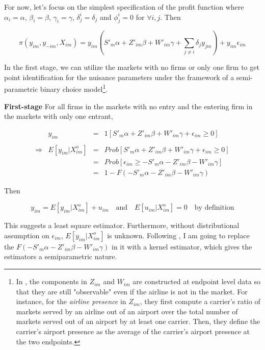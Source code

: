 \documentclass[a4paper]{article}
\begin{document}
For now, let's focus on the simplest specification of the profit function where $\alpha_i=\alpha$, $\beta_i=\beta$, $\gamma_i=\gamma$, $\delta_j^i=\delta_j$ and $\phi_j^i=0$ for $\forall i,j$. Then 

\begin{equation}
\pi(y_{im},y_{-im},X_{im})=y_{im}(S'_m\alpha+Z'_{im}\beta+W'_{im}\gamma+\sum_{j\neq i}\delta_{j} y_{jm})+y_{im}\epsilon_{im} 
\end{equation}



In the first stage, we can utilize the markets with no firms or only one firm to get point identification for the nuisance parameters under the framework of a semi-parametric binary choice model\footnote{In \cite{ciliberto2009market}, the components in $Z_{im}$ and $W_{im}$ are constructed at endpoint level data so that they are still "observable" even if the airline is not in the market. For instance, for the \textit{airline presence} in $Z_{im}$, they first compute a carrier's ratio of markets served by an airline out of an airport over the total number of markets served out of an airport by at least one carrier. Then, they define the carrier's airport presence as the average of the carrier's airport presence at the two endpoints.}. 

\bigskip

\textbf{First-stage} For all firms in the markets with no entry and the entering firm in the markets with only one entrant,

$$
\begin{array}{rccl}
& y_{im} & = & 1[S'_m\alpha+Z'_{im}\beta+W'_{im}\gamma+\epsilon_{im} \geq 0]  \\
\\
\Longrightarrow &  E[y_{im}|X^o_{im}] & = & Prob[S'_m\alpha+Z'_{im}\beta+W'_{im}\gamma+\epsilon_{im} \geq 0] \\
& &=&Prob[\epsilon_{im} \geq -S'_m\alpha - Z'_{im}\beta - W'_{im}\gamma]\\
& &=&1 - F(- S'_m\alpha - Z'_{im}\beta - W'_{im}\gamma) 
\end{array}
$$

Then

$$y_{im} = E[y_{im}|X^o_{im}] + u_{im} \quad \mbox{and} \quad E[u_{im}|X^o_{im}] = 0 \quad \mbox{by definition} $$

This suggests a least square estimator. Furthermore, without distributional assumption on $\epsilon_{im}$, $E[y_{im}|X^o_{im}]$ is unknown. Following  \cite{ichimura1993semiparametric}, I am going to replace the $F(- S'_m\alpha - Z'_{im}\beta - W'_{im}\gamma)$ in it with a kernel estimator, which gives the estimators a semiparametric nature. 
\end{document}
